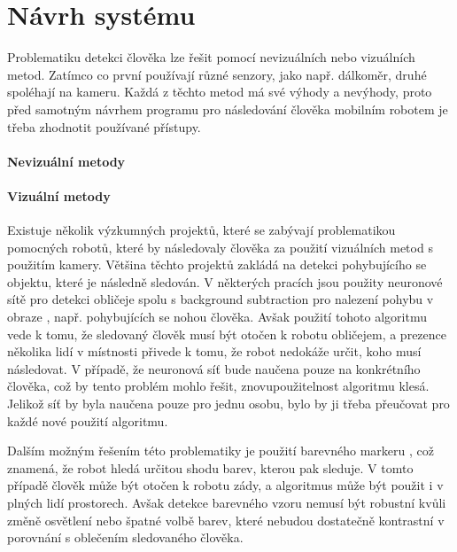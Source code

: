 \documentclass[twoside]{ctuthesis}
\theoremstyle{plain}
\theoremstyle{definition}
\theoremstyle{note}
\begin{document}
\chapter{Návrh systému}


Problematiku detekci člověka lze řešit pomocí nevizuálních nebo vizuálních metod. Zatímco co první používají různé senzory, jako např. dálkoměr, druhé spoléhají na kameru. Každá z těchto metod má své výhody a nevýhody, proto před samotným návrhem programu pro následování člověka mobilním robotem je třeba zhodnotit používané přístupy.

\subsubsection{Nevizuální metody} 

\subsubsection{Vizuální metody}

Existuje několik výzkumných projektů, které se zabývají problematikou pomocných robotů, které by následovaly člověka za použití vizuálních metod s použitím kamery. Většina těchto projektů zakládá na detekci pohybujícího se objektu, které je následně sledován. V některých pracích jsou použity neuronové sítě pro detekci obličeje spolu s background subtraction pro nalezení pohybu v obraze \cite{cite:19}, např. pohybujících se nohou člověka. Avšak použití tohoto algoritmu vede k tomu, že sledovaný člověk musí být otočen k robotu obličejem, a prezence několika lidí v místnosti přivede k tomu, že robot nedokáže určit, koho musí následovat. V případě, že neuronová síť bude naučena pouze na konkrétního člověka, což by tento problém mohlo řešit, znovupoužitelnost algoritmu klesá. Jelikož síť by byla naučena pouze pro jednu osobu, bylo by ji třeba přeučovat pro každé nové použití algoritmu.

Dalším možným řešením této problematiky je použití barevného markeru \cite{cite:18}, což znamená, že robot hledá určitou shodu barev, kterou pak sleduje. V tomto případě člověk může být otočen k robotu zády, a algoritmus může být použit i v plných lidí prostorech. Avšak detekce barevného vzoru nemusí být robustní kvůli změně osvětlení nebo špatné volbě barev, které nebudou dostatečně kontrastní v porovnání s oblečením sledovaného člověka.
\end{document}
